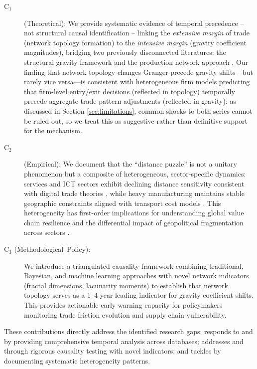\documentclass[preprint, 3p,
authoryear]{elsarticle} %
\begin{document}
\begin{description}
\item[C$_1$ \label{c1}]  (Theoretical): We provide systematic evidence of temporal precedence -- not structural causal identification -- linking the \textit{extensive margin} of trade (network topology formation) to the \textit{intensive margin} (gravity coefficient magnitudes), bridging two previously disconnected literatures: the structural gravity framework \citep{anderson2003, headmayer2014, yotov2024evolution} and the production network approach \citep{acemoglu2012, chaney2014, bernard2018networks}. Our finding that network topology changes Granger-precede gravity shifts---but rarely vice versa---is consistent with heterogeneous firm models \citep{helpman2008, melitz2015new} predicting that firm-level entry/exit decisions (reflected in topology) temporally precede aggregate trade pattern adjustments (reflected in gravity): as discussed in Section \ref{sec:limitations}, common shocks to both series cannot be ruled out, so we treat this as suggestive rather than definitive support for the mechanism.

\item[C$_2$ \label{c2}] (Empirical): We document that the ``distance puzzle'' \citep{disdier2008} is not a unitary phenomenon but a composite of heterogeneous, sector-specific dynamics: services and ICT sectors exhibit declining distance sensitivity consistent with digital trade theories \citep{lendle2016, antras2025uncharted}, while heavy manufacturing maintains stable geographic constraints aligned with transport cost models \citep{hummels2005}. This heterogeneity has first-order implications for understanding global value chain resilience \citep{bonadio2021, carvalho2021} and the differential impact of geopolitical fragmentation across sectors \citep{alfaro2023reallocation, freund2024supply}.

\item[C$_3$ (Methodological--Policy):] \label{c3} We introduce a triangulated causality framework combining traditional, Bayesian, and machine learning approaches with novel network indicators (fractal dimensions, lacunarity moments) to establish that network topology serves as a 1--4 year leading indicator for gravity coefficient shifts. This provides actionable early warning capacity for policymakers monitoring trade friction evolution and supply chain vulnerability.
\end{description}

These contributions directly address the identified research gaps:
 responds to  and  by providing
comprehensive temporal analysis across databases;  addresses
 and  through rigorous causality testing with
novel indicators; and  tackles  by documenting
systematic heterogeneity patterns.
\end{document}
